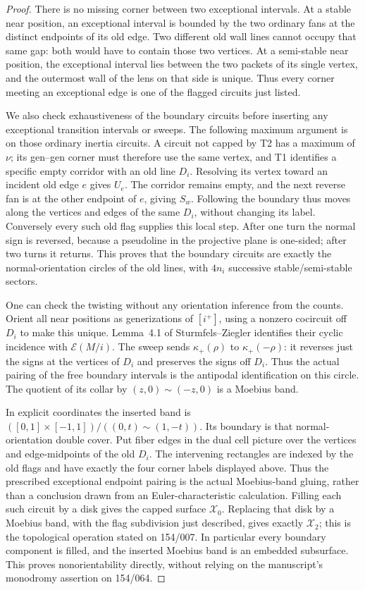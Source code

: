 \begin{proof}
There is no missing corner between two exceptional intervals. At a
stable near position, an exceptional interval is bounded by the two
ordinary fans at the distinct endpoints of its old edge. Two different
old wall lines cannot occupy that same gap: both would have to contain
those two vertices. At a semi-stable near position, the exceptional
interval lies between the two packets of its single vertex, and the
outermost wall of the lens on that side is unique. Thus every corner
meeting an exceptional edge is one of the flagged circuits just listed.

We also check exhaustiveness of the boundary circuits before inserting
any exceptional transition intervals or sweeps. The following maximum
argument is on those ordinary inertia circuits. A circuit not capped by T2 has a maximum of
$\nu$; its gen--gen corner must therefore use the same vertex, and
T1 identifies a specific empty corridor with an old line $D_i$.
Resolving its vertex toward an incident old edge $e$ gives $U_e$.
The corridor remains empty, and the next reverse fan is at the other
endpoint of $e$, giving $S_w$. Following the boundary thus moves along
the vertices and edges of the same $D_i$, without changing its label.
Conversely every such old flag supplies this local step. After one
turn the normal sign is reversed, because a pseudoline in the
projective plane is one-sided; after two turns it returns. This proves
that the boundary circuits are exactly the normal-orientation circles
of the old lines, with $4n_i$ successive stable/semi-stable sectors.

One can check the twisting without any orientation inference from the
counts. Orient all near positions as generizations of $[i^+]$, using
a nonzero cocircuit off $D_i$ to make this unique. Lemma~4.1 of
Sturmfels--Ziegler identifies their cyclic incidence with
$\mathcal E(M/i)$. The sweep sends
$\kappa_+(\rho)$ to $\kappa_+(-\rho)$: it reverses just the signs at
the vertices of $D_i$ and preserves the signs off $D_i$.
Thus the actual pairing of the free boundary intervals is the
antipodal identification on this circle. The quotient of its collar
by $(z,0)\sim(-z,0)$ is a Moebius band.

In explicit coordinates the inserted band is
$([0,1]\times[-1,1])/((0,t)\sim(1,-t))$.
Its boundary is that normal-orientation double cover. Put fiber edges
in the dual cell picture over the vertices and edge-midpoints of the
old $D_i$. The intervening
rectangles are indexed by the old flags and have exactly the four
corner labels displayed above. Thus the prescribed exceptional
endpoint pairing is the actual Moebius-band gluing, rather than a
conclusion drawn from an Euler-characteristic calculation.
Filling each such circuit by a disk gives the capped surface
$\mathcal X_0$. Replacing that disk by a Moebius band, with the flag
subdivision just described, gives exactly $\mathcal X_2$; this is the
topological operation stated on 154/007. In particular every boundary
component is filled, and the inserted Moebius band is an embedded
subsurface. This proves nonorientability directly, without relying on
the manuscript's monodromy assertion on 154/064.


\end{proof}
